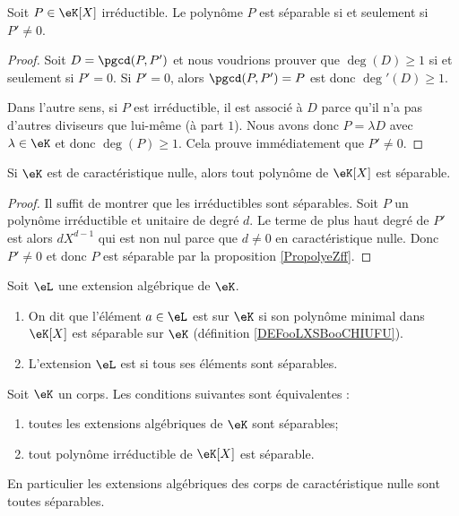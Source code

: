 \begin{proposition}
    Soit \( P\in \eK[X]\) irréductible. Le polynôme \( P\) est séparable si et seulement si \( P'\neq 0\).
\end{proposition}

\begin{proof}
    Soit \( D=\pgcd(P,P')\) et nous voudrions prouver que \( \deg(D)\geq 1\) si et seulement si \( P'=0\). Si \( P'=0\), alors \( \pgcd(P,P')=P\) est donc \( \deg'(D)\geq 1\).

    Dans l'autre sens, si \( P\) est irréductible, il est associé à \( D\) parce qu'il n'a pas d'autres diviseurs que lui-même (à part \( 1\)). Nous avons donc \( P=\lambda D\) avec \( \lambda\in \eK\) et donc \( \deg(P)\geq 1\). Cela prouve immédiatement que \( P'\neq 0\).
\end{proof}

\begin{corollary}   \label{CorUjfJSE}
    Si \( \eK\) est de caractéristique nulle, alors tout polynôme de \( \eK[X]\) est séparable.
\end{corollary}

\begin{proof}
    Il suffit de montrer que les irréductibles sont séparables. Soit \( P\) un polynôme irréductible et unitaire de degré \( d\). Le terme de plus haut degré de \( P'\) est alors \( dX^{d-1}\) qui est non nul parce que \( d\neq 0\) en caractéristique nulle. Donc \( P'\neq 0\) et donc \( P\) est séparable par la proposition \ref{PropolyeZff}.
\end{proof}

\begin{definition}
    Soit \( \eL\) une extension algébrique de \( \eK\).
    \begin{enumerate}
        \item
            On dit que l'élément \( a\in \eL\) est  sur \( \eK\) si son polynôme minimal dans \( \eK[X]\) est séparable sur \( \eK\) (définition \ref{DEFooLXSBooCHIUFU}).
        \item
            L'extension \( \eL\) est  si tous ses éléments sont séparables.
    \end{enumerate}
\end{definition}

\begin{proposition} \label{PropUmxJVw}
    Soit \( \eK\) un corps. Les conditions suivantes sont équivalentes :
    \begin{enumerate}
        \item       \label{ITEMooUSKRooDmsGmw}
            toutes les extensions algébriques de \( \eK\) sont séparables;
        \item       \label{ITEMooJGWLooKInxSG}
            tout polynôme irréductible de \( \eK[X]\) est séparable.
    \end{enumerate}
    En particulier les extensions algébriques des corps de caractéristique nulle sont toutes séparables.
\end{proposition}

